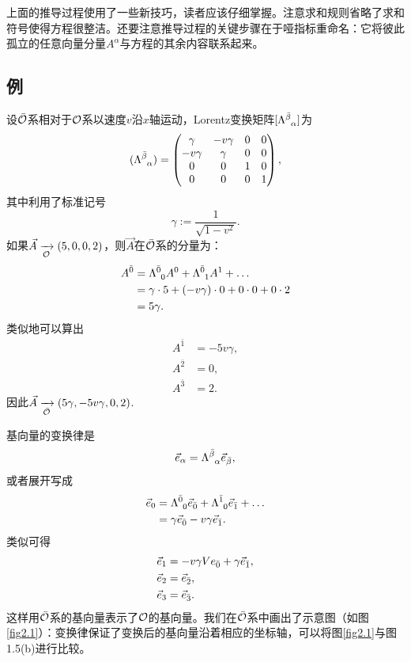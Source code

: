 上面的推导过程使用了一些新技巧，读者应该仔细掌握。注意求和规则省略了求和符号使得方程很整洁。还要注意推导过程的关键步骤在于哑指标重命名：它将彼此孤立的任意向量分量$A^\alpha$与方程的其余内容联系起来。

\subsection*{例}
设$\bar{\mathcal{O}}$系相对于$\mathcal{O}$系以速度$v$沿$x$轴运动，Lorentz变换矩阵$[\Lambda\indices{^{\bar{\beta}}_{\alpha}}]$为
\[
    (\Lambda\indices{^{\bar{\beta}}_{\alpha}}) = 
    \begin{pmatrix}
        \gamma & -v\gamma & 0 & 0 \\
        -v \gamma & \gamma & 0 & 0 \\
        0 & 0 & 1 & 0 \\
        0 & 0 & 0 & 1
    \end{pmatrix},
\]
其中利用了标准记号
\[
    \gamma := \frac{1}{\sqrt{1 - v^2}}.
\]
如果$\vec{A} \xrightarrow[\mathcal{O}]{ } (5, 0, 0, 2)$，则$\vec{A}$在$\bar{\mathcal{O}}$系的分量为：
\begin{align*}
    A^{\bar{0}} &= \Lambda\indices{^{\bar{0}}_0} A^0 + \Lambda\indices{^{\bar{0}}_1} A^1 + \dots \\
    &= \gamma \cdot 5 + (-v \gamma) \cdot 0 + 0 \cdot 0 + 0 \cdot 2 \\
    &= 5\gamma.
\end{align*}
类似地可以算出
\begin{align*}
    A^{\bar{1}} &= -5v\gamma, \\
    A^{\bar{2}} &= 0, \\
    A^{\bar{3}} &= 2.
\end{align*}
因此$\vec{A} \xrightarrow[\bar{\mathcal{O}}]{ } (5\gamma, -5v\gamma, 0, 2)$.

基向量的变换律是
\[
    \Ve_\alpha = \Lambda\indices{^{\bar{\beta}}_\alpha} \Ve_{\bar{\beta}},
\]
或者展开写成
\begin{align*}
    \Ve_0 &= \Lambda\indices{^{\bar{0}}_0} \Ve_{\bar{0}} + \Lambda\indices{^{\bar{1}}_{0}} \Ve_{\bar{1}} + \dots \\
    &= \gamma \Ve_{\bar{0}} - v \gamma \Ve_{\bar{1}}.
\end{align*}
类似可得
\begin{align*}
    \vec{e}_1 &= -v \gamma Ve_{\bar{0}} + \gamma \vec{e}_{\bar{1}}, \\
    \vec{e}_2 &= \vec{e}_{\bar{2}}, \\
    \vec{e}_3 &= \vec{e}_{\bar{3}}.
\end{align*}
这样用$\bar{\mathcal{O}}$系的基向量表示了$\mathcal{O}$的基向量。我们在$\bar{\mathcal{O}}$系中画出了示意图（如图\ref{fig2.1}）：变换律保证了变换后的基向量沿着相应的坐标轴，可以将图\ref{fig2.1}与图1.5(b)进行比较。


